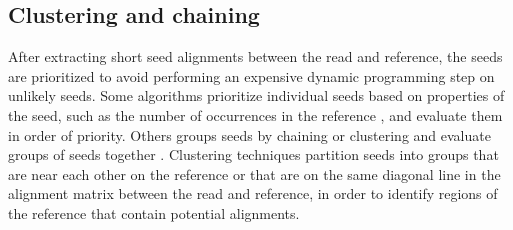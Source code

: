 \documentclass[11pt]{ucscthesis}
\begin{document}



\subsection{Clustering and chaining}

After extracting short seed alignments between the read and reference, the seeds are prioritized to avoid performing an expensive dynamic programming step on unlikely seeds.
Some algorithms prioritize individual seeds based on properties of the seed, such as the number of occurrences in the reference  \cite{langmead_bowtie2_2012}, and evaluate them in order of priority.
Others groups seeds by chaining or clustering and evaluate groups of seeds together \cite{li_bwa_mem_2013,li_minimap2_2018,lee_mosaik_2014,jain_mashmap_2018}.
Clustering techniques partition seeds into groups that are near each other on the reference or that are on the same diagonal line in the alignment matrix between the read and reference, in order to identify regions of the reference that contain potential alignments.
\end{document}
